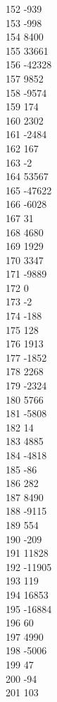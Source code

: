 { 152	-939 \\
 153	-998 \\
 154	8400 \\
 155	33661 \\
 156	-42328 \\
 157	9852 \\
 158	-9574 \\
 159	174 \\
 160	2302 \\
 161	-2484 \\
 162	167 \\
 163	-2 \\
 164	53567 \\
 165	-47622 \\
 166	-6028 \\
 167	31 \\
 168	4680 \\
 169	1929 \\
 170	3347 \\
 171	-9889 \\
 172	0 \\
 173	-2 \\
 174	-188 \\
 175	128 \\
 176	1913 \\
 177	-1852 \\
 178	2268 \\
 179	-2324 \\
 180	5766 \\
 181	-5808 \\
 182	14 \\
 183	4885 \\
 184	-4818 \\
 185	-86 \\
 186	282 \\
 187	8490 \\
 188	-9115 \\
 189	554 \\
 190	-209 \\
 191	11828 \\
 192	-11905 \\
 193	119 \\
 194	16853 \\
 195	-16884 \\
 196	60 \\
 197	4990 \\
 198	-5006 \\
 199	47 \\
 200	-94 \\
 201	103 \\
}

